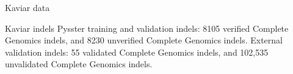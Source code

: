 \begin{column}{\onecolwid}
\begin{block}{Kaviar data}
\begin{alertblock}{Kaviar indels}
Pysster training and validation indels: 8105 verified Complete Genomics indels, and 8230 unverified Complete Genomics indels. External validation indels: 55 validated Complete Genomics indels, and 102,535 unvalidated Complete Genomics indels.
\end{alertblock}

\end{block}



\end{column} %